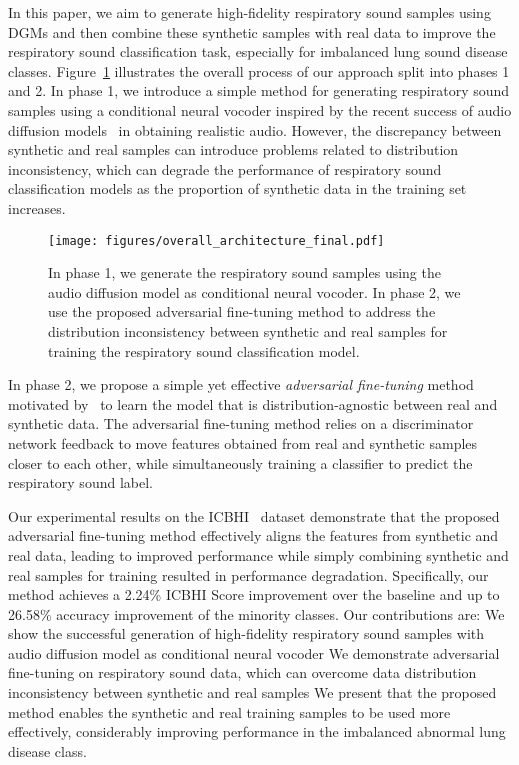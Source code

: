 \documentclass{article}
\begin{document}
In this paper, we aim to generate high-fidelity respiratory sound samples using DGMs and then combine these synthetic samples with real data to improve the respiratory sound classification task, especially for imbalanced lung sound disease classes.
Figure~\ref{fig:overview} illustrates the overall process of our approach split into phases 1 and 2.
In phase 1, we introduce a simple method for generating respiratory sound samples using a conditional neural vocoder inspired by the recent success of audio diffusion models~\cite{ho2020denoising, kong2020diffwave} in obtaining realistic audio.
However, the discrepancy between synthetic and real samples can introduce problems related to distribution inconsistency,
which can degrade the performance of respiratory sound classification models as the proportion of synthetic data in the training set increases.
\begin{figure}
    \centering
    \texttt{[image: figures/overall\_architecture\_final.pdf]} 
    \caption{In phase 1, we generate the respiratory sound samples using the audio diffusion model as conditional neural vocoder. In phase 2, we use the proposed adversarial fine-tuning method to address the distribution inconsistency between synthetic and real samples for training the respiratory sound classification model.}
    \label{fig:overview}
\end{figure}
In phase 2, we propose a simple yet effective \emph{adversarial fine-tuning} method motivated by~\cite{ganin2016domain} to learn the model that is distribution-agnostic between real and synthetic data.
The adversarial fine-tuning method relies on a discriminator network feedback to move features obtained from real and synthetic samples closer to each other, while simultaneously training a classifier to predict the respiratory sound label.


Our experimental results on the ICBHI~\cite{rocha2018alpha} dataset demonstrate that the proposed adversarial fine-tuning method effectively aligns the features from synthetic and real data, leading to improved performance while simply combining synthetic and real samples for training resulted in performance degradation. 
Specifically, our method achieves a 2.24\% ICBHI Score improvement over the baseline and up to 26.58\% accuracy improvement of the minority classes.
Our contributions are:  We show the successful generation of high-fidelity respiratory sound samples with audio diffusion model as conditional neural vocoder  We demonstrate adversarial fine-tuning on respiratory sound data, which can overcome data distribution inconsistency between synthetic and real samples  We present that the proposed method enables the synthetic and real training samples to be used more effectively, considerably improving performance in the imbalanced abnormal lung disease class.
\end{document}
